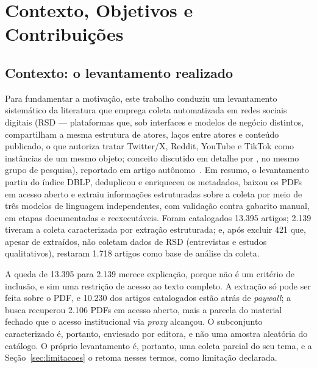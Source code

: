 
\chapter{Contexto, Objetivos e Contribuições}
\label{cap:objetivos}

\section{Contexto: o levantamento realizado}
\label{sec:contexto-survey}

Para fundamentar a motivação, este trabalho conduziu um levantamento sistemático
da literatura que emprega coleta automatizada em redes sociais digitais (RSD ---
plataformas que, sob interfaces e modelos de negócio distintos, compartilham a mesma
estrutura de atores, laços entre atores e conteúdo publicado, o que autoriza tratar
Twitter/X, Reddit, YouTube e TikTok como instâncias de um mesmo objeto; conceito
discutido em detalhe por , no mesmo grupo de pesquisa),
reportado em artigo autônomo~\cite{barreto2026survey}. Em resumo, o levantamento partiu do
índice DBLP, deduplicou e enriqueceu os metadados, baixou os PDFs em acesso aberto
e extraiu informações estruturadas sobre a coleta por meio de três modelos de
linguagem independentes, com validação contra gabarito manual, em etapas
documentadas e reexecutáveis. Foram catalogados 13.395 artigos; 2.139 tiveram a
coleta caracterizada por extração estruturada; e, após excluir 421 que, apesar de
extraídos, não coletam dados de RSD (entrevistas e estudos qualitativos), restaram
1.718 artigos como base de análise da coleta.

A queda de 13.395 para 2.139 merece explicação, porque não é um critério de
inclusão, e sim uma restrição de acesso ao texto completo. A extração só pode ser
feita sobre o PDF, e 10.230 dos artigos catalogados estão atrás de
\textit{paywall}; a busca recuperou 2.106 PDFs em acesso aberto, mais a parcela do
material fechado que o acesso institucional via \textit{proxy} alcançou. O
subconjunto caracterizado é, portanto, enviesado por editora, e não uma amostra
aleatória do catálogo. O próprio levantamento é, portanto, uma coleta parcial do
seu tema, e a Seção~\ref{sec:limitacoes} o retoma nesses termos, como limitação
declarada.

